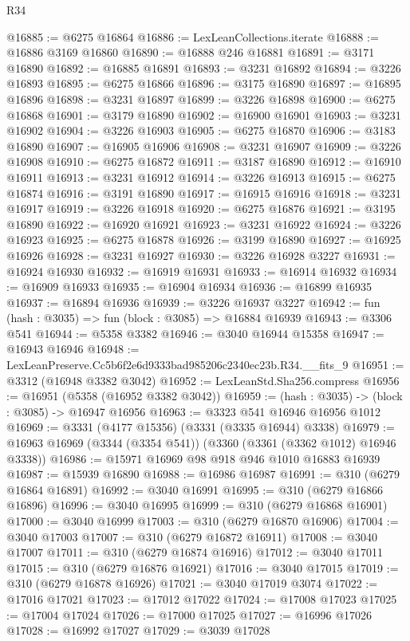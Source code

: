 \begin{lexlean}{R34}
\begin{coremodule}
@16885 := @6275 @16864
@16886 := LexLeanCollections.iterate
@16888 := @16886 @3169 @16860
@16890 := @16888 @246 @16881
@16891 := @3171 @16890
@16892 := @16885 @16891
@16893 := @3231 @16892
@16894 := @3226 @16893
@16895 := @6275 @16866
@16896 := @3175 @16890
@16897 := @16895 @16896
@16898 := @3231 @16897
@16899 := @3226 @16898
@16900 := @6275 @16868
@16901 := @3179 @16890
@16902 := @16900 @16901
@16903 := @3231 @16902
@16904 := @3226 @16903
@16905 := @6275 @16870
@16906 := @3183 @16890
@16907 := @16905 @16906
@16908 := @3231 @16907
@16909 := @3226 @16908
@16910 := @6275 @16872
@16911 := @3187 @16890
@16912 := @16910 @16911
@16913 := @3231 @16912
@16914 := @3226 @16913
@16915 := @6275 @16874
@16916 := @3191 @16890
@16917 := @16915 @16916
@16918 := @3231 @16917
@16919 := @3226 @16918
@16920 := @6275 @16876
@16921 := @3195 @16890
@16922 := @16920 @16921
@16923 := @3231 @16922
@16924 := @3226 @16923
@16925 := @6275 @16878
@16926 := @3199 @16890
@16927 := @16925 @16926
@16928 := @3231 @16927
@16930 := @3226 @16928 @3227
@16931 := @16924 @16930
@16932 := @16919 @16931
@16933 := @16914 @16932
@16934 := @16909 @16933
@16935 := @16904 @16934
@16936 := @16899 @16935
@16937 := @16894 @16936
@16939 := @3226 @16937 @3227
@16942 := fun (hash : @3035) => fun (block : @3085) => @16884 @16939
@16943 := @3306 @541
@16944 := @5358 @3382
@16946 := @3040 @16944 @15358
@16947 := @16943 @16946
@16948 := LexLeanPreserve.Cc5b6f2e6d9333bad985206c2340ec23b.R34.__fits_9
@16951 := @3312 (@16948 @3382 @3042)
@16952 := LexLeanStd.Sha256.compress
@16956 := @16951 (@5358 (@16952 @3382 @3042))
@16959 := (hash : @3035) -> (block : @3085) -> @16947 @16956
@16963 := @3323 @541 @16946 @16956 @1012
@16969 := @3331 (@4177 @15356) (@3331 (@3335 @16944) @3338)
@16979 := @16963 @16969 (@3344 (@3354 @541)) (@3360 (@3361 (@3362 @1012) @16946 @3338))
@16986 := @15971 @16969 @98 @918 @946 @1010 @16883 @16939
@16987 := @15939 @16890
@16988 := @16986 @16987
@16991 := @310 (@6279 @16864 @16891)
@16992 := @3040 @16991
@16995 := @310 (@6279 @16866 @16896)
@16996 := @3040 @16995
@16999 := @310 (@6279 @16868 @16901)
@17000 := @3040 @16999
@17003 := @310 (@6279 @16870 @16906)
@17004 := @3040 @17003
@17007 := @310 (@6279 @16872 @16911)
@17008 := @3040 @17007
@17011 := @310 (@6279 @16874 @16916)
@17012 := @3040 @17011
@17015 := @310 (@6279 @16876 @16921)
@17016 := @3040 @17015
@17019 := @310 (@6279 @16878 @16926)
@17021 := @3040 @17019 @3074
@17022 := @17016 @17021
@17023 := @17012 @17022
@17024 := @17008 @17023
@17025 := @17004 @17024
@17026 := @17000 @17025
@17027 := @16996 @17026
@17028 := @16992 @17027
@17029 := @3039 @17028

\end{coremodule}
\end{lexlean}
